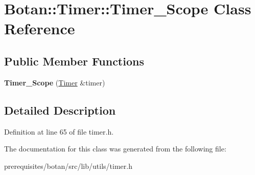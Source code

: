 \hypertarget{class_botan_1_1_timer_1_1_timer___scope}{}\section{Botan\+:\+:Timer\+:\+:Timer\+\_\+\+Scope Class Reference}
\label{class_botan_1_1_timer_1_1_timer___scope}
\subsection*{Public Member Functions}
\begin{DoxyCompactItemize}
\item 
\mbox{\label{class_botan_1_1_timer_1_1_timer___scope_a98c5a97b387a0f71eb51996103157f57}} 
{\bfseries Timer\+\_\+\+Scope} (\mbox{\hyperlink{class_botan_1_1_timer}{Timer}} \&timer)
\end{DoxyCompactItemize}


\subsection{Detailed Description}


Definition at line 65 of file timer.\+h.



The documentation for this class was generated from the following file\+:\begin{DoxyCompactItemize}
\item 
prerequisites/botan/src/lib/utils/timer.\+h\end{DoxyCompactItemize}

